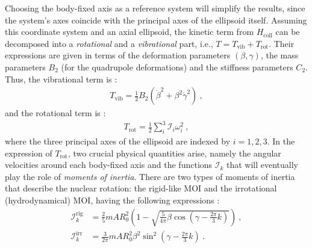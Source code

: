 Choosing the body-fixed axis as a reference system will simplify the results, since the system's axes coincide with the principal axes of the ellipsoid itself. Assuming this coordinate system and an axial ellipsoid, the kinetic term from $H_\text{coll}$ can be decomposed into a \emph{rotational} and a \emph{vibrational} part, i.e., $T=T_\text{vib}+T_\text{rot}$. Their expressions are given in terms of the deformation parameters $(\beta,\gamma)$, the mass parameters $B_2$ (for the quadrupole deformations) and the stiffness parameters $C_2$. Thus, the vibrational term is \cite{li2022model}:
\begin{align}
    T_\text{vib}=\frac{1}{2}B_2\left(\dot{\beta}^2+\beta^2\dot{\gamma}^2\right)\ ,
    \label{kinetic-vibrational-energy-collective}
\end{align}
and the rotational term is \cite{li2022model}:
\begin{align}
    T_\text{rot}=\frac{1}{2}\sum_i^3\mathcal{I}_i\omega_i^2\ ,
    \label{kinetic-rotational-energy-collective}
\end{align}
where the three principal axes of the ellipsoid are indexed by $i=1,2,3$. In the expression of $T_\text{rot}$, two crucial physical quantities arise, namely the angular velocities around each body-fixed axis and the functions $\mathcal{I}_k$ that will eventually play the role of \emph{moments of inertia}. 
There are two types of moments of inertia that describe the nuclear rotation: the rigid-like MOI and the irrotational (hydrodynamical) MOI, having the following expressions \cite{bohr1954rotational,ring2004nuclear}:
\begin{align}
    \mathcal{I}_k^\text{rig}&=\frac{2}{5}mAR_0^2\left(1-\sqrt{\frac{5}{4\pi}\beta\cos\left(\gamma-\frac{2\pi}{3}k\right)}\right)\ ,\\
    \mathcal{I}_k^\text{irr}&=\frac{3}{2\pi}mAR_0^2\beta^2\sin^2\left(\gamma-\frac{2\pi}{3}k\right)\ .
    \label{eq-irrotational-rigid-mois}
\end{align}

